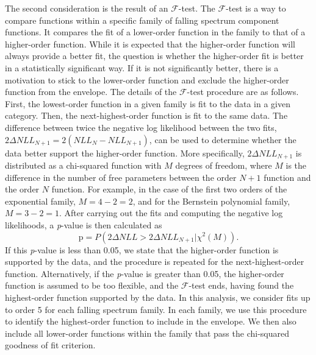 The second consideration is the result of an $\mathcal{F}$-test. The $\mathcal{F}$-test is a way to compare functions within a specific family of 
falling spectrum component functions. It compares the fit of a lower-order function in the family to that of a higher-order function. 
While it is expected that the higher-order function will always provide a better fit, the question is whether the higher-order 
fit is better in a statistically significant way. If it is not significantly better, there is a motivation to stick to the lower-order function and exclude the higher-order function from the envelope. 
The details of the $\mathcal{F}$-test procedure are as follows. 
First, the lowest-order function in a given family is fit to the data in a given
category. Then, the next-highest-order function is fit to the same data. The difference between twice 
the negative log likelihood between the two fits, $2\Delta NLL_{N+1} = 2(NLL_{N}-NLL_{N+1})$, 
can be used to determine whether the data better support the higher-order function. 
More specifically, $2\Delta NLL_{N+1}$ is distributed as a chi-squared function with $M$ degrees of 
freedom, where $M$ is the difference in the number of free parameters between the order $N+1$ 
function and the order $N$ function. For example, in the case of the first two orders of 
the exponential family, $M = 4-2 = 2$, and for the Bernstein polynomial family, $M=3-2=1$. 
After carrying out the fits and computing the negative log likelihoods, a \textit{p}-value is then calculated as 
\begin{equation}
\mathrm{p} = P(2\Delta NLL > 2\Delta NLL_{N+1} | \chi^{2}(M)).
\end{equation}
If this \textit{p}-value is less than 0.05, we state that the higher-order function is supported by the 
data, and the procedure is repeated for the next-highest-order function. Alternatively, if the 
\textit{p}-value is greater than 0.05, the higher-order function is assumed to be too flexible, 
and the $\mathcal{F}$-test ends, having found the highest-order function supported by the data.
In this analysis, we consider fits up to order 5 for each falling spectrum family.
In each family, we use this procedure to identify the highest-order function to include in the envelope. 
We then also include all lower-order functions within the family that pass the chi-squared goodness of fit criterion.

